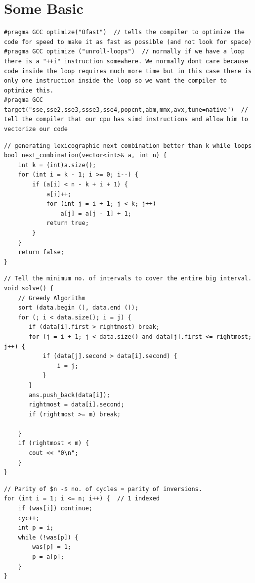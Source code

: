 \documentclass[8pt, a4paper, oneside, twocolumn]{extarticle}
\begin{document}
\section{Some Basic}
\begin{verbatim}
#pragma GCC optimize("Ofast")  // tells the compiler to optimize the code for speed to make it as fast as possible (and not look for space)
#pragma GCC optimize ("unroll-loops")  // normally if we have a loop there is a "++i" instruction somewhere. We normally dont care because code inside the loop requires much more time but in this case there is only one instruction inside the loop so we want the compiler to optimize this.
#pragma GCC target("sse,sse2,sse3,ssse3,sse4,popcnt,abm,mmx,avx,tune=native")  // tell the compiler that our cpu has simd instructions and allow him to vectorize our code
\end{verbatim}
\begin{verbatim}
// generating lexicographic next combination better than k while loops
bool next_combination(vector<int>& a, int n) {
    int k = (int)a.size();
    for (int i = k - 1; i >= 0; i--) {
        if (a[i] < n - k + i + 1) {
            a[i]++;
            for (int j = i + 1; j < k; j++)
                a[j] = a[j - 1] + 1;
            return true;
        }
    }
    return false;
}
\end{verbatim}
\begin{verbatim}
// Tell the minimum no. of intervals to cover the entire big interval.
void solve() {
    // Greedy Algorithm
    sort (data.begin (), data.end ()); 
    for (; i < data.size(); i = j) {
       if (data[i].first > rightmost) break;
       for (j = i + 1; j < data.size() and data[j].first <= rightmost; j++) {
           if (data[j].second > data[i].second) {
               i = j;
           }
       }
       ans.push_back(data[i]);
       rightmost = data[i].second;
       if (rightmost >= m) break;

    }
    if (rightmost < m) {
       cout << "0\n";
    }
}
\end{verbatim}
\begin{verbatim}
// Parity of $n -$ no. of cycles = parity of inversions.
for (int i = 1; i <= n; i++) {  // 1 indexed
    if (was[i]) continue;
    cyc++;
    int p = i;
    while (!was[p]) {
        was[p] = 1;
        p = a[p];
    }
}
\end{verbatim}
\end{document}
